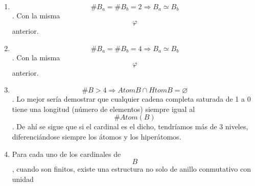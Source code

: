 \documentclass[
]{article}
\providecommand{\tightlist}{%
  \setlength{\itemsep}{0pt}\setlength{\parskip}{0pt}}
\begin{document}
\begin{enumerate}
\begin{enumerate}
\begin{enumerate}
      \begin{enumerate}
      \def\labelenumiv{\arabic{enumiv}.}
      \tightlist
      \item
        \[\begin{matrix}
        {n{: = \#}\left( {\mathit{Atom}B} \right)} \\
        {{n \leq m}{: = \#}\left( B \right)} \\
        {\left\lbrack {1,n} \right\rbrack_{\mathbb{N}}{: = {\{{1,2,\ldots,n}\}}}} \\
        {\varphi:@{\left( {\mathit{Atom}\left( B \right)} \right)\rightarrow B}} \\
        {{\varphi{(x)}}{: =}\begin{Bmatrix}
        0 & \Leftarrow & {{x = \varnothing} = {\{\}}} \\
        {x_{1}'} & \Leftarrow & {x = {\{{x_{1}'}\}}} \\
        {{\sum\limits_{\substack{k \in I \\ I \subset {\lbrack{1,n}\rbrack}_{\mathbb{N}}}}x_{k}}'} & \Leftarrow & {x = {\{{{x_{i}'} \mid {{i \in I} \subset \left\lbrack {1,n} \right\rbrack_{\mathbb{N}}}}\}}} \\
        {x_{1}{{' + \ldots} + x_{i - 1}}{' + x_{i}}{{' + \ldots} + x_{n}}'} & \Leftarrow & {{x = \mathit{Atom}}{{(B)} \smallsetminus {\{{x_{i}'}\}}}} \\
        1 & \Leftarrow & {{x = \mathit{Atom}}{(B)}}
        \end{Bmatrix}}
        \end{matrix}\].
      \end{enumerate}
    \item
      \[\#{B_{a} = \#}{B_{b} = 2}\Rightarrow{B_{a} \simeq B_{b}}\]. Con
      la misma \[\varphi\] anterior.
    \item
      \[\#{B_{a} = \#}{B_{b} = 4}\Rightarrow{B_{a} \simeq B_{b}}\]. Con
      la misma \[\varphi\] anterior.
    \item
      \[\#{B > 4}\Rightarrow\mathit{Atom}{B \cap \mathit{Htom}}{B = \varnothing}\].
      Lo mejor sería demostrar que cualquier cadena completa saturada de
      1 a 0 tiene una longitud (número de elementos) siempre igual al
      \[\#\mathit{Atom}{(B)}\]. De ahí se sigue que si el cardinal es el
      dicho, tendríamos más de 3 niveles, diferenciándose siempre los
      átomos y los hiperátomos.
    \item
      Para cada uno de los cardinales de \[B\], cuando son finitos,
      existe una estructura no solo de anillo conmutativo con unidad

\end{enumerate}
\end{enumerate}
\end{enumerate}
\end{document}
